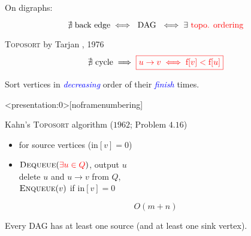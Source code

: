 
\begin{frame}
  \centerline{\large On digraphs:}
  \[
	\nexists\; \text{back edge} \iff \text{ DAG } \iff \exists \textcolor{red}{\text{ topo. ordering}}
  \]

  \pause
  \begin{block}{\textsc{Toposort} by Tarjan , 1976}
    \vspace{0.30cm}
    \[
      \nexists \text{ cycle} \implies \textcolor{red}{\boxed{u \to v \iff \text{f}[v] < \text{f}[u]}}
    \]

    \vspace{0.50cm}
    \centerline{Sort vertices in \textcolor{blue}{\emph{decreasing}} order of their \textcolor{blue}{\emph{finish}} times.}
  \end{block}
\end{frame}

\begin{frame}<presentation:0>[noframenumbering]
  \begin{exampleblock}{Kahn's \textsc{Toposort} algorithm ($1962$; Problem $4.16$) }
    \begin{itemize}
      \setlength{\itemsep}{5pt}
      \item {} for source vertices ($\text{in}[v] = 0$)
	  \item {} $\textsc{Dequeue}(\textcolor{red}{\exists u \in Q})$, output $u$ \\[6pt]
	\hspace{1.3cm} delete $u$ and $u \to v$ from $Q$, \\[5pt]
	\hspace{1.3cm} $\textsc{Enqueue}(v)$ if $\text{in}[v] = 0$
    \end{itemize}
  \end{exampleblock}

  \pause
  \[
    O(m + n)
  \]

  \pause
  \begin{lemma}
    Every DAG has at least one source (and at least one sink vertex).
  \end{lemma}

  \pause
  \vspace{0.50cm}
  \centerline{}
\end{frame}

